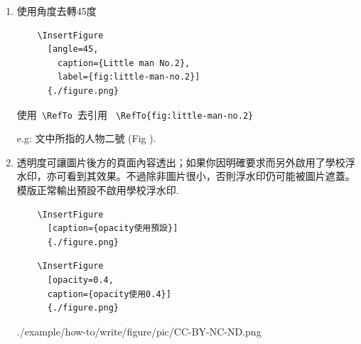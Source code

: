 \begin{enumerate}
  \newpage
  \item
  {
    使用角度去轉45度
    \begin{verbatim}
    \InsertFigure
      [angle=45,
        caption={Little man No.2},
        label={fig:little-man-no.2}]
      {./figure.png}
    \end{verbatim}

    使用\verb| \RefTo |去引用 \verb| \RefTo{fig:little-man-no.2} |

    e.g: 文中所指的人物二號 (Fig ).
  } %

  \newpage
  \item
  {
    透明度可讓圖片後方的頁面內容透出；如果你因明確要求而另外啟用了學校浮水印，亦可看到其效果。不過除非圖片很小，否則浮水印仍可能被圖片遮蓋。模版正常輸出預設不啟用學校浮水印.\\

    \vspace{2.0cm}

    \begin{verbatim}
    \InsertFigure
      [caption={opacity使用預設}]
      {./figure.png}
    \end{verbatim}


    \newpage
    \EmptyLine
    \vspace{2.5cm}

    \begin{verbatim}
    \InsertFigure
      [opacity=0.4,
      caption={opacity使用0.4}]
      {./figure.png}
    \end{verbatim}


    \newpage
    \EmptyLine
    \vspace{7.0cm}

    {
      {./example/how-to/write/figure/pic/CC-BY-NC-ND.png}
    }

    \vspace{1.0cm}

}
\end{enumerate}
